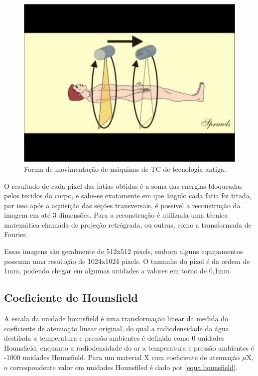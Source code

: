 \begin{figure}[ht]
 \begin{center}
  \includegraphics{imagens/tc2.jpg}
 \end{center}
 \caption{Forma de movimentação de máquinas de TC de tecnologia antiga.}
 \label{fig:tc2}
\end{figure}

O resultado de cada pixel das fatias obtidas é a soma das energias bloqueadas pelos tecidos do corpo, e sabe-se exatamente em que ângulo cada fatia foi tirada, por isso após a aquisição das seções transversais, é possivel a reconstrução da imagem em até 3 dimensões. Para a reconstrução é utilizada uma técnica matemática chamada de projeção retrógrada, ou outras, como a transformada de Fourier.


Essas imagens são geralmente de 512x512 pixels, embora alguns equipamentos possuam uma resolução de 1024x1024 pixels. O tamanho do pixel é da ordem de 1mm, podendo chegar em algumas unidades a valores em torno de 0,1mm.

\subsection{Coeficiente de Hounsfield}

A escala da unidade hounsfield é uma transformação linear da medida do coeficiente de atenuação linear original, do qual a radiodensidade da água destilada a temperatura e pressão ambientes é definida como 0 unidades Hounsfield, enquanto a radiodensidade do ar a temperatura e pressão ambientes é -1000 unidades Hounsfield. Para um material X com coeficiente de atenuação $\mu$X, o correspondente valor em unidades Hounsfiled é dado por \ref{equa:hounsfield}.

